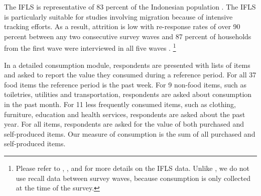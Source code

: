 \documentclass[12pt]{article}
\begin{document}
The IFLS is representative of 83 percent of the Indonesian population \citep{strauss2004third}. The IFLS is particularly suitable for studies involving migration because of intensive tracking efforts. As a result, attrition is low with re-response rates of over 90 percent between any two consecutive survey waves and 87 percent of households from the first wave were interviewed in all five waves \citep{straussFifthWaveIndonesia2016}.%
\footnote{Please refer to \cite{kleemansLabourMarketResponses2018}, \cite{hamoryReevaluatingAgriculturalProductivity2021}, and \cite{kleemansMigrationChoiceRisk} for more details on the IFLS data. Unlike \cite{hamoryReevaluatingAgriculturalProductivity2021}, we do not use recall data between survey waves, because consumption is only collected at the time of the survey.}

In a detailed consumption module, respondents are presented with lists of items and asked to report the value they consumed during a reference period. For all 37 food items the reference period is the past week. For 9 non-food items, such as toiletries, utilities and transportation, respondents are asked about consumption in the past month. For 11 less frequently consumed items, such as clothing, furniture, education and health services,  respondents are asked about the past year. For all items, respondents are asked for the value of both purchased and self-produced items. Our measure of consumption is the sum of all purchased and self-produced items.

\end{document}
